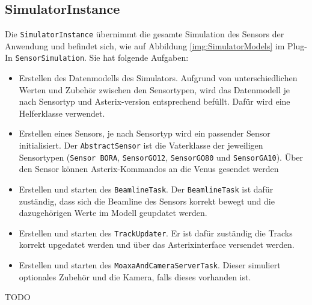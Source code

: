 \subsection{SimulatorInstance}

Die \texttt{SimulatorInstance} übernimmt die gesamte Simulation des Sensors der Anwendung und befindet sich, wie auf Abbildung \ref{img:SimulatorModels} im Plug-In \texttt{SensorSimulation}. Sie hat folgende Aufgaben:

\begin{itemize}
    \item Erstellen des Datenmodells des Simulators. Aufgrund von unterschiedlichen Werten und Zubehör zwischen den Sensortypen, wird das       Datenmodell je nach Sensortyp und Asterix-version entsprechend befüllt. Dafür wird eine Helferklasse verwendet.
    \item Erstellen eines Sensors, je nach Sensortyp wird ein passender Sensor initialisiert. 
        Der \texttt{AbstractSensor} ist die Vaterklasse der jeweiligen Sensortypen (\texttt{Sensor BORA}, \texttt{SensorGO12}, \texttt{SensorGO80} und \texttt{SensorGA10}). Über den Sensor können Asterix-Kommandos an die Venus gesendet werden
    
    \item Erstellen und starten des \texttt{BeamlineTask}. Der \texttt{BeamlineTask} ist dafür zuständig, dass sich die Beamline des Sensors korrekt bewegt und die dazugehörigen Werte im Modell geupdatet werden.
    \item Erstellen und starten des \texttt{TrackUpdater}. Er ist dafür zuständig die Tracks korrekt upgedatet werden und über das Asterixinterface versendet werden.
    \item Erstellen und starten des \texttt{MoaxaAndCameraServerTask}. Dieser simuliert optionales Zubehör und die Kamera, falls dieses vorhanden ist.    
    
\end{itemize}

TODO
